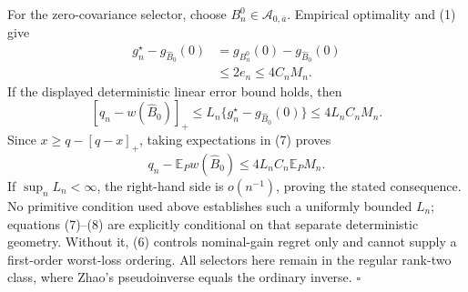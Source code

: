 For the zero-covariance selector, choose \(B_n^0\in\mathcal A_{0,\overline a}\).  Empirical optimality and (1) give
\[
\begin{aligned}
g_n^\star-g_{\widehat B_0}(0)
&=g_{B_n^0}(0)-g_{\widehat B_0}(0)\\
&\le2e_n
\le4C_nM_n.
\end{aligned}
\tag{6}
\]
If the displayed deterministic linear error bound holds, then
\[
[q_n-w(\widehat B_0)]_+
\le L_n\{g_n^\star-g_{\widehat B_0}(0)\}
\le4L_nC_nM_n.
\tag{7}
\]
Since \(x\ge q-[q-x]_+\), taking expectations in (7) proves
\[
q_n-\mathbb E_Pw(\widehat B_0)
\le4L_nC_n\mathbb E_PM_n.
\tag{8}
\]
If \(\sup_nL_n<\infty\), the right-hand side is \(o(n^{-1})\), proving the stated consequence.  No primitive condition used above establishes such a uniformly bounded \(L_n\); equations (7)--(8) are explicitly conditional on that separate deterministic geometry.  Without it, (6) controls nominal-gain regret only and cannot supply a first-order worst-loss ordering.  All selectors here remain in the regular rank-two class, where Zhao's pseudoinverse equals the ordinary inverse.  \(\square\)